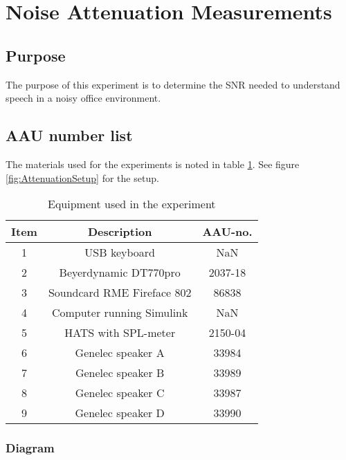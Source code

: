 \section{Noise Attenuation Measurements}

\subsection{Purpose}

The purpose of this experiment is to determine the SNR needed to understand speech in a noisy office environment. 

\subsection{AAU number list}
The materials used for the experiments is noted in table \ref{tab:UsedEquipmentListningAttenuation}. See figure \ref{fig:AttenuationSetup} for the setup.

\begin{table}[h]
	\centering
	
	\begin{tabular}{ c c c } \toprule
		{Item} & {Description} & {AAU-no}. \\ \bottomrule 
		1      	&  USB keyboard							& NaN		\\
		2      	&  Beyerdynamic DT770pro				& 2037-18	\\
		3      	&  Soundcard RME Fireface 802           & 86838		\\
		4      	&  Computer	running Simulink			& NaN		\\  
		5		&  HATS with SPL-meter				& 2150-04	\\
		6      	&  Genelec speaker A					& 33984		\\
		7      	&  Genelec speaker B					& 33989		\\
		8      	&  Genelec speaker C					& 33987		\\
		9      	&  Genelec speaker D					& 33990		\\ \bottomrule 
	\end{tabular}
	\caption{Equipment used in the experiment}
	\label{tab:UsedEquipmentListningAttenuation}
\end{table}



\subsubsection{Diagram}

